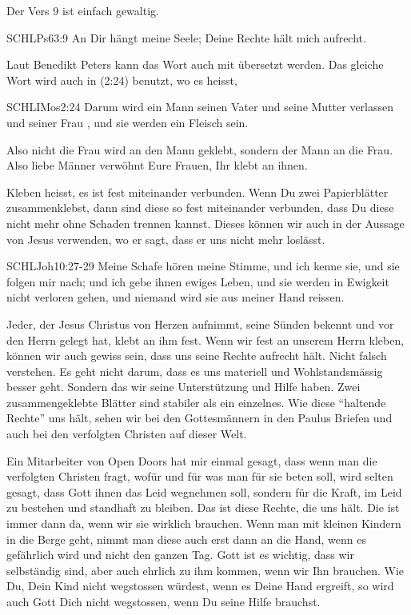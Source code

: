 \documentclass[14pt]{../../inc/mybib}
\begin{document}
    \begin{block}
        Der Vers 9 ist einfach gewaltig.
        \begin{bibelbox}{SCHL}{Ps}{63:9}
            An Dir hängt meine Seele; Deine Rechte hält mich aufrecht.
        \end{bibelbox}
        Laut Benedikt Peters kann das Wort  auch mit  übersetzt werden. Das gleiche Wort wird auch in  (2:24) benutzt, wo es heisst, 
        \begin{bibelbox}{SCHL}{IMos}{2:24}
            Darum wird ein Mann seinen Vater und seine Mutter verlassen und seiner Frau , und sie werden ein Fleisch sein.
        \end{bibelbox}
        Also nicht die Frau wird an den Mann geklebt, sondern der Mann an die Frau. Also liebe Männer verwöhnt Eure Frauen, Ihr klebt an ihnen.

        Kleben heisst, es ist fest miteinander verbunden. Wenn Du zwei Papierblätter zusammenklebst, dann sind diese so fest miteinander verbunden, dass Du diese nicht mehr ohne Schaden trennen kannst. Dieses  können wir auch in der Aussage von Jesus verwenden, wo er sagt, dass er uns nicht mehr loslässt. 
        \begin{bibelbox}{SCHL}{Joh}{10:27-29}
            Meine Schafe hören meine Stimme, und ich kenne sie, und sie folgen mir nach; und ich gebe ihnen ewiges Leben, und sie werden in Ewigkeit nicht verloren gehen, und niemand wird sie aus meiner Hand reissen.
        \end{bibelbox}
        Jeder, der Jesus Christus von Herzen aufnimmt, seine Sünden bekennt und vor den Herrn gelegt hat, klebt an ihm fest. Wenn wir fest an unserem Herrn kleben, können wir auch gewiss sein, dass uns seine Rechte aufrecht hält. Nicht falsch verstehen. Es geht nicht darum, dass es uns materiell und Wohlstandsmässig besser geht. Sondern das wir seine Unterstützung und Hilfe haben. Zwei zusammengeklebte Blätter sind stabiler als ein einzelnes. Wie diese \enquote{haltende Rechte} uns hält, sehen wir bei den Gottesmännern in den Paulus Briefen und auch bei den verfolgten Christen auf dieser Welt. 
        
        Ein Mitarbeiter von Open Doors hat mir einmal gesagt, dass wenn man die verfolgten Christen fragt, wofür und für was man für sie beten soll, wird selten gesagt, dass Gott ihnen das Leid wegnehmen soll, sondern für die Kraft, im Leid zu bestehen und standhaft zu bleiben. Das ist diese Rechte, die uns hält. Die ist immer dann da, wenn wir sie wirklich brauchen. Wenn man mit kleinen Kindern in die Berge geht, nimmt man diese auch erst dann an die Hand, wenn es gefährlich wird und nicht den ganzen Tag. Gott ist es wichtig, dass wir selbständig sind, aber auch ehrlich zu ihm kommen, wenn wir Ihn brauchen. Wie Du, Dein Kind nicht wegstossen würdest, wenn es Deine Hand ergreift, so wird auch Gott Dich nicht wegstossen, wenn Du seine Hilfe brauchst.
    \end{block}
\end{document}

